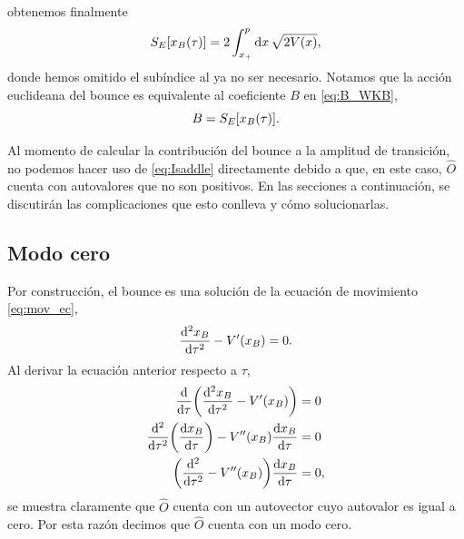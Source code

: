 obtenemos finalmente
\begin{equation}\label{eq:bounce4}
S_E\qty[x_B\qty(\tau)] = 2 \int_{x_+}^{p} \dd{x} \sqrt{2 V\qty(x)},
\end{equation}
donde hemos omitido el subíndice al ya no ser necesario. Notamos que la acción euclideana del bounce es equivalente al coeficiente $B$ en \eqref{eq:B_WKB}, 
\begin{equation}
	B = S_E\qty[x_B\qty(\tau)].
\end{equation}

 
Al momento de calcular la contribución del bounce a la amplitud de transición, no podemos hacer uso de \eqref{eq:Isaddle} directamente debido a que, en este caso, $\hat{O}$ cuenta con autovalores que no son positivos. En las secciones a continuación, se discutirán las complicaciones que esto conlleva y cómo solucionarlas. 

\subsection{Modo cero} \label{sec:modo_zero}

Por construcción, el bounce es una solución de la ecuación de movimiento \eqref{eq:mov_ec},
\begin{equation}\label{eq:mov_ec_bounce}
\dv[2]{x_B}{\tau} - V' \qty(x_B) = 0.
\end{equation}
Al derivar la ecuación anterior respecto a $\tau$,
\begin{align}
	\dv{\tau}\qty(\dv[2]{x_B}{\tau} - V'\qty(x_B)) &= 0 \\
	\dv[2]{\tau}\qty(\dv{x_B}{\tau}) - V''\qty(x_B)\dv{x_B}{\tau} &= 0 \\
	\qty(\dv[2]{\tau} - V''\qty(x_B))\dv{x_B}{\tau} &= 0, \label{eq:eom_modo_cero}
\end{align}
se muestra claramente que $\hat{O}$ cuenta con un autovector cuyo autovalor es igual a cero. Por esta razón decimos que $\hat{O}$ cuenta con un modo cero.

